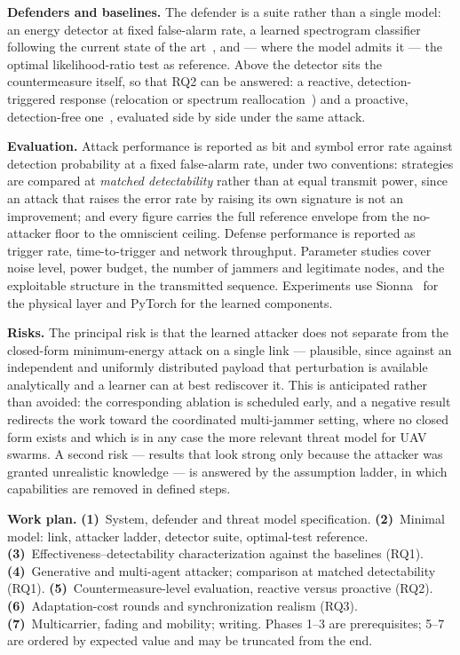 \documentclass[10pt,a4paper]{article}
\begin{document}
\textbf{Defenders and baselines.} The defender is a suite rather than a single model: an energy
detector at fixed false-alarm rate, a learned spectrogram classifier following the current state
of the art~\cite{li2022jamming}, and --- where the model admits it --- the optimal
likelihood-ratio test as reference. Above the detector sits the countermeasure itself, so that
RQ2 can be answered: a reactive, detection-triggered response (relocation or spectrum
reallocation~\cite{nguyen2025marl,abolhassani2025coordinated}) and a proactive, detection-free
one~\cite{leuenberger2025proactive,strasser2009novel}, evaluated side by side under the same
attack.

\textbf{Evaluation.} Attack performance is reported as bit and symbol error rate against
detection probability at a fixed false-alarm rate, under two conventions: strategies are compared
at \emph{matched detectability} rather than at equal transmit power, since an attack that raises
the error rate by raising its own signature is not an improvement; and every figure carries the
full reference envelope from the no-attacker floor to the omniscient ceiling. Defense performance
is reported as trigger rate, time-to-trigger and network throughput. Parameter studies cover
noise level, power budget, the number of jammers and legitimate nodes, and the exploitable
structure in the transmitted sequence. Experiments use Sionna~\cite{hoydis2022sionna} for the
physical layer and PyTorch for the learned components.

\textbf{Risks.} The principal risk is that the learned attacker does not separate from the
closed-form minimum-energy attack on a single link --- plausible, since against an independent
and uniformly distributed payload that perturbation is available analytically and a learner can
at best rediscover it. This is anticipated rather than avoided: the corresponding ablation is
scheduled early, and a negative result redirects the work toward the coordinated multi-jammer
setting, where no closed form exists and which is in any case the more relevant threat model for
UAV swarms. A second risk --- results that look strong only because the attacker was granted
unrealistic knowledge --- is answered by the assumption ladder, in which capabilities are removed
in defined steps.

\textbf{Work plan.} \textbf{(1)}~System, defender and threat model specification.
\textbf{(2)}~Minimal model: link, attacker ladder, detector suite, optimal-test reference.
\textbf{(3)}~Effectiveness--detectability characterization against the baselines (RQ1).
\textbf{(4)}~Generative and multi-agent attacker; comparison at matched detectability (RQ1).
\textbf{(5)}~Countermeasure-level evaluation, reactive versus proactive (RQ2).
\textbf{(6)}~Adaptation-cost rounds and synchronization realism (RQ3). \textbf{(7)}~Multicarrier,
fading and mobility; writing. Phases 1--3 are prerequisites; 5--7 are ordered by expected value
and may be truncated from the end.
\end{document}

